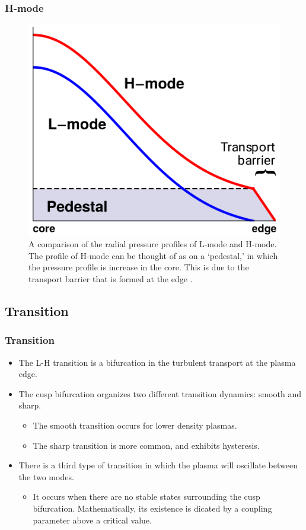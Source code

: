 \documentclass{beamer}
\begin{document}
\begin{frame}
\frametitle{H-mode}
	\begin{figure}
		\includegraphics[width=0.5\linewidth]{../../Graphics/L-mode_H-mode_compare.png}
		\caption{A comparison of the radial pressure profiles of L-mode and H-mode.
		The profile of H-mode can be thought of as on a ‘pedestal,’ in which the pressure profile is increase in the core.
		This is due to the transport barrier that is formed at the
		edge \cite{weymiens_bifurcation_2014}.}
		\label{fig:L-mode_H-mode_compare}
	\end{figure}
\end{frame}


\subsection{Transition}
\begin{frame}
\frametitle{Transition}
	\begin{itemize}
		\item The L-H transition is a bifurcation in the turbulent transport at the plasma edge.
		\item The cusp bifurcation organizes two different transition dynamics: smooth and sharp.
		\begin{itemize}
			\item The smooth transition occurs for lower density plasmas.
			\item The sharp transition is more common, and exhibits hysteresis.
		\end{itemize}
		\item There is a third type of transition in which the plasma will oscillate between the two modes.
		\begin{itemize}
			\item It occurs when there are no stable states surrounding the cusp bifurcation.
			Mathematically, its existence is dicated by a coupling parameter above a critical value.
		\end{itemize}
	\end{itemize}
\end{frame}
\end{document}

